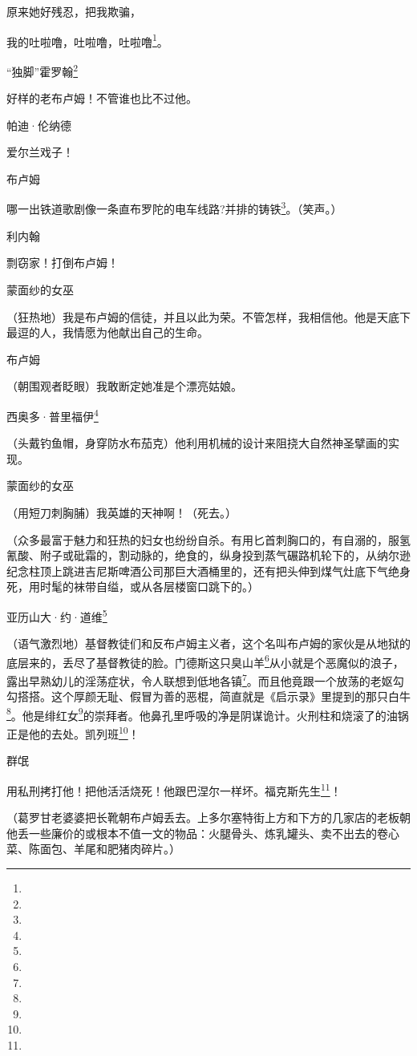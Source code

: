 \par 原来她好残忍，把我欺骗，
\par 我的吐啦噜，吐啦噜，吐啦噜\footnote{}。
\par “独脚”霍罗翰\footnote{}
\par 好样的老布卢姆！不管谁也比不过他。
\par 帕迪·伦纳德
\par 爱尔兰戏子！
\par 布卢姆
\par 哪一出铁道歌剧像一条直布罗陀的电车线路?并排的铸铁\footnote{}。（笑声。）
\par 利内翰
\par 剽窃家！打倒布卢姆！
\par 蒙面纱的女巫
\par （狂热地）我是布卢姆的信徒，并且以此为荣。不管怎样，我相信他。他是天底下最逗的人，我情愿为他献出自己的生命。
\par 布卢姆
\par （朝围观者眨眼）我敢断定她准是个漂亮姑娘。
\par 西奥多·普里福伊\footnote{}
\par （头戴钓鱼帽，身穿防水布茄克）他利用机械的设计来阻挠大自然神圣擘画的实现。
\par 蒙面纱的女巫
\par （用短刀刺胸脯）我英雄的天神啊！（死去。）
\par （众多最富于魅力和狂热的妇女也纷纷自杀。有用匕首刺胸口的，有自溺的，服氢氰酸、附子或砒霜的，割动脉的，绝食的，纵身投到蒸气碾路机轮下的，从纳尔逊纪念柱顶上跳进吉尼斯啤酒公司那巨大酒桶里的，还有把头伸到煤气灶底下气绝身死，用时髦的袜带自缢，或从各层楼窗口跳下的。）
\par 亚历山大·约·道维\footnote{}
\par （语气激烈地）基督教徒们和反布卢姆主义者，这个名叫布卢姆的家伙是从地狱的底层来的，丢尽了基督教徒的脸。门德斯这只臭山羊\footnote{}从小就是个恶魔似的浪子，露出早熟幼儿的淫荡症状，令人联想到低地各镇\footnote{}。而且他竟跟一个放荡的老妪勾勾搭搭。这个厚颜无耻、假冒为善的恶棍，简直就是《启示录》里提到的那只白牛\footnote{}。他是绯红女\footnote{}的崇拜者。他鼻孔里呼吸的净是阴谋诡计。火刑柱和烧滚了的油锅正是他的去处。凯列班\footnote{}！
\par 群氓
\par 用私刑拷打他！把他活活烧死！他跟巴涅尔一样坏。福克斯先生\footnote{}！
\par （葛罗甘老婆婆把长靴朝布卢姆丢去。上多尔塞特街上方和下方的几家店的老板朝他丢一些廉价的或根本不值一文的物品：火腿骨头、炼乳罐头、卖不出去的卷心菜、陈面包、羊尾和肥猪肉碎片。）
